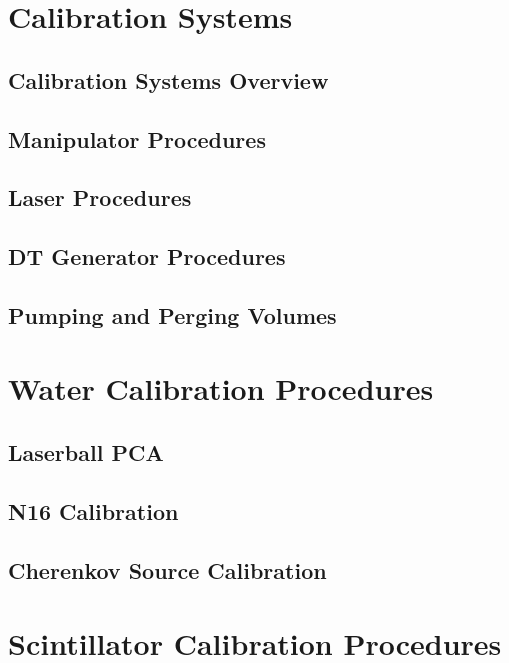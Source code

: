 \documentclass[10pt]{report}
\begin{document}
\part{Calibration Systems}
\chapter{Calibration Systems Overview}

\chapter{Manipulator Procedures}

\chapter{Laser Procedures}

\chapter{DT Generator Procedures}


\chapter{Pumping and Perging Volumes}
\part{Water Calibration Procedures}
\chapter{Laserball PCA}

\chapter{N16 Calibration}

\chapter{Cherenkov Source Calibration}

\part{Scintillator Calibration Procedures}
\end{document}
